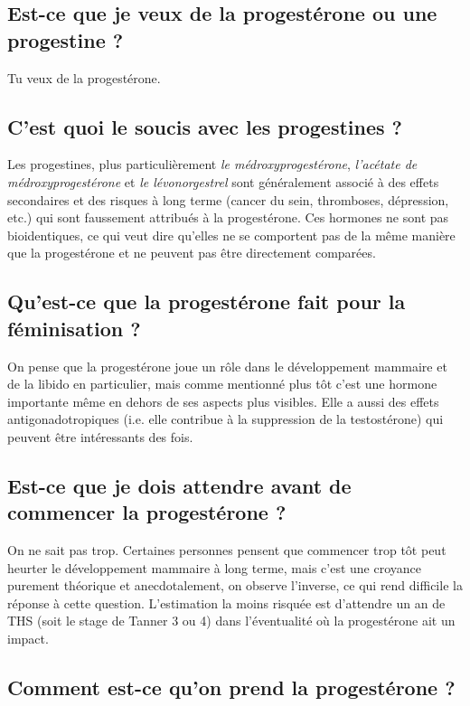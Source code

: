 \documentclass{article}
\begin{document}
\subsection{Est-ce que je veux de la progestérone ou une progestine ?}

Tu veux de la progestérone.

\subsection{C'est quoi le soucis avec les progestines ?}

Les progestines, plus particulièrement \textit{le médroxyprogestérone}, \textit{l'acétate de médroxyprogestérone} et \textit{le lévonorgestrel} sont généralement associé à des effets secondaires et des risques à long terme (cancer du sein, thromboses, dépression, etc.) qui sont faussement attribués à la progestérone. Ces hormones ne sont pas bioidentiques, ce qui veut dire qu'elles ne se comportent pas de la même manière que la progestérone et ne peuvent pas être directement comparées.

\subsection{Qu'est-ce que la progestérone fait pour la féminisation ?}

On pense que la progestérone joue un rôle dans le développement mammaire et de la libido en particulier, mais comme mentionné plus tôt c'est une hormone importante même en dehors de ses aspects plus visibles. Elle a aussi des effets antigonadotropiques (i.e. elle contribue à la suppression de la testostérone) qui peuvent être intéressants des fois. 

\subsection{Est-ce que je dois attendre avant de commencer la progestérone ?}

On ne sait pas trop. Certaines personnes pensent que commencer trop tôt peut heurter le développement mammaire à long terme, mais c'est une croyance purement théorique et anecdotalement, on observe l'inverse, ce qui rend difficile la réponse à cette question. L'estimation la moins risquée est d'attendre un an de THS (soit le stage de Tanner 3 ou 4) dans l'éventualité où la progestérone ait un impact. 

\subsection{Comment est-ce qu'on prend la progestérone ?}
\end{document}
